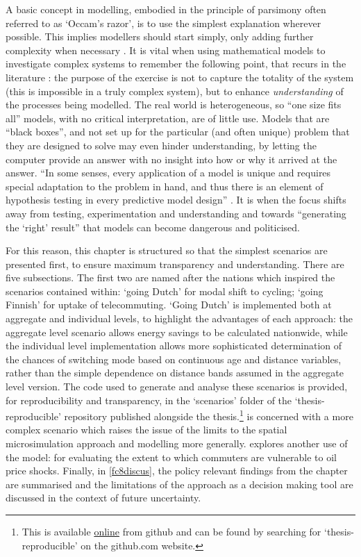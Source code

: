 \documentclass[a4paper, 11pt, twoside]{Thesis}
\begin{document}
A basic concept in modelling, embodied in the principle of parsimony
often referred to as `Occam's razor',
is to use the simplest explanation wherever possible. This implies
modellers should start simply, only adding further complexity when
necessary \citep{batty1976urban}.  It is vital when
using mathematical models to investigate complex systems to remember the
following point, that recurs in the literature \citep{Wilson1970, Smil1993,
MacKay2009}: the purpose of the exercise is not to capture the totality
of the system (this is impossible in a truly complex system), but to enhance
\emph{understanding} of the processes being modelled.
The real world is heterogeneous, so ``one size fits all'' models, with no
critical interpretation, are of little use. Models that are ``black
boxes'', and not set up for the particular (and often unique) problem that they
are designed to solve may even hinder understanding,
by letting the computer provide an answer with no insight into how or why it
arrived at the answer. ``In some senses, every
application of a model is unique and requires special adaptation to the
problem in hand, and thus there is an element of hypothesis testing in
every predictive model design'' \citep[p.~4]{batty1976urban}. It is when the
focus shifts away from testing, experimentation and understanding and towards
``generating the `right' result'' that models can become dangerous and
politicised.

For this reason, this chapter is structured so that the simplest 
scenarios are presented first, to ensure maximum transparency and
understanding.
There are
five subsections.
The first two are named after the nations which inspired the 
scenarios contained within: `going Dutch' for modal shift to cycling;
`going Finnish' for uptake of telecommuting.
`Going Dutch' is implemented both at aggregate and individual levels,
to highlight the advantages of each approach: the aggregate level
scenario allows energy savings to be calculated nationwide, while the
individual level implementation allows more sophisticated determination
of the chances of switching mode based on continuous age and distance
variables, rather than the simple dependence on distance bands
assumed in the aggregate level version. The code used to generate and analyse
these scenarios is provided, for reproducibility and transparency, in the
`scenarios' folder of the `thesis-reproducible' repository published alongside
the thesis.\footnote{This is
available
{\color{blue}\href{https://github.com/Robinlovelace/thesis-reproducible}{online}
} from github and can be found by searching for
`thesis-reproducible' on the github.com website.}
 is concerned
with a more complex scenario which raises the issue of the limits to the
spatial microsimulation approach and modelling more generally. 
explores another use of the model: for evaluating the
extent to which commuters are vulnerable to oil price shocks. Finally, in
\cref{fc8discus}, the policy relevant findings from the chapter are summarised
and the limitations of the approach as a decision making
tool are discussed in the context of future uncertainty.
\end{document}
